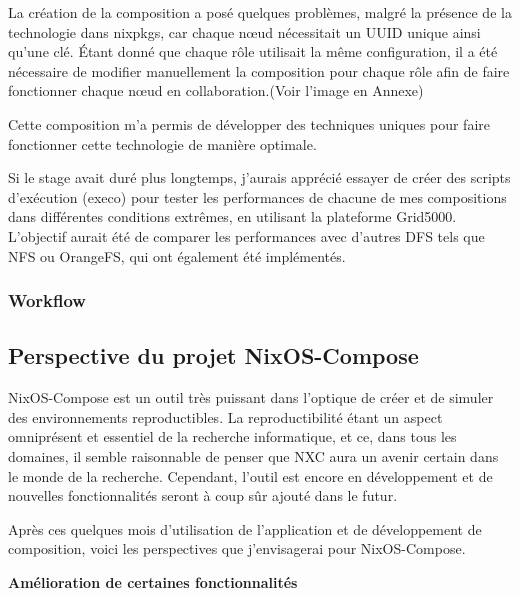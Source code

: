 \documentclass[a4paper,french,12pt, titlepage]{article}
\begin{document}
La création de la composition a posé quelques problèmes, malgré la
présence de la technologie dans nixpkgs, car chaque nœud nécessitait un
UUID unique ainsi qu'une clé. Étant donné que chaque rôle utilisait la
même configuration, il a été nécessaire de modifier manuellement la
composition pour chaque rôle afin de faire fonctionner chaque nœud en
collaboration.(Voir l'image en Annexe)\newline

Cette composition m'a permis de développer des techniques uniques pour
faire fonctionner cette technologie de manière optimale.\newline

Si le stage avait duré plus longtemps, j'aurais apprécié essayer de
créer des scripts d'exécution (execo) pour tester les performances de
chacune de mes compositions dans différentes conditions extrêmes, en
utilisant la plateforme Grid5000. L'objectif aurait été de comparer les
performances avec d'autres DFS tels que NFS ou OrangeFS, qui ont
également été implémentés.\newline

\hypertarget{workflow}{%
\subsubsection{Workflow}\label{workflow}}

\newpage

\hypertarget{perspective-du-projet-nixos-compose}{%
\subsection{Perspective du projet
NixOS-Compose}\label{perspective-du-projet-nixos-compose}}

NixOS-Compose est un outil très puissant dans l'optique de créer et de
simuler des environnements reproductibles. La reproductibilité étant un
aspect omniprésent et essentiel de la recherche informatique, et ce,
dans tous les domaines, il semble raisonnable de penser que NXC aura un
avenir certain dans le monde de la recherche. Cependant, l'outil est
encore en développement et de nouvelles fonctionnalités seront à coup
sûr ajouté dans le futur.

Après ces quelques mois d'utilisation de l'application et de
développement de composition, voici les perspectives que j'envisagerai
pour NixOS-Compose.\newline

\textbf{Amélioration de certaines fonctionnalités}\newline
\end{document}
